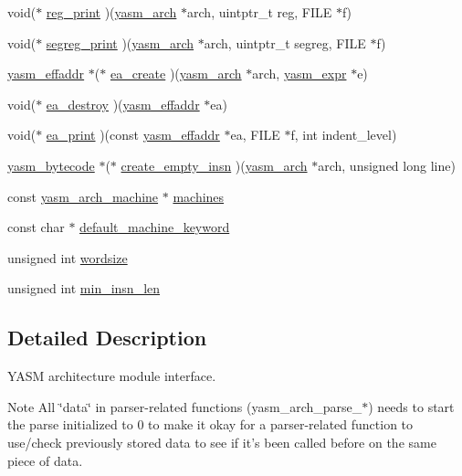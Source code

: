 \begin{DoxyCompactItemize}
\item 
void($\ast$ \hyperlink{structyasm__arch__module_a6dc5cfaa6ddd2c654abf3599ba219ef0}{reg\-\_\-print} )(\hyperlink{coretype_8h_a8e0de61d73c940f0e7b6ef12e0dc1c70}{yasm\-\_\-arch} $\ast$arch, uintptr\-\_\-t reg, F\-I\-L\-E $\ast$f)
\item 
void($\ast$ \hyperlink{structyasm__arch__module_a0cc2000fdd21f86497271c6957f0a833}{segreg\-\_\-print} )(\hyperlink{coretype_8h_a8e0de61d73c940f0e7b6ef12e0dc1c70}{yasm\-\_\-arch} $\ast$arch, uintptr\-\_\-t segreg, F\-I\-L\-E $\ast$f)
\item 
\hyperlink{structyasm__effaddr}{yasm\-\_\-effaddr} $\ast$($\ast$ \hyperlink{structyasm__arch__module_ac41bf595c524eed5dfebb16514eefad3}{ea\-\_\-create} )(\hyperlink{coretype_8h_a8e0de61d73c940f0e7b6ef12e0dc1c70}{yasm\-\_\-arch} $\ast$arch, \hyperlink{structyasm__expr}{yasm\-\_\-expr} $\ast$e)
\item 
void($\ast$ \hyperlink{structyasm__arch__module_acfe30289d9c3300986fe4f73c92ca644}{ea\-\_\-destroy} )(\hyperlink{structyasm__effaddr}{yasm\-\_\-effaddr} $\ast$ea)
\item 
void($\ast$ \hyperlink{structyasm__arch__module_a70b26bcf811aabae77bccd78594ca731}{ea\-\_\-print} )(const \hyperlink{structyasm__effaddr}{yasm\-\_\-effaddr} $\ast$ea, F\-I\-L\-E $\ast$f, int indent\-\_\-level)
\item 
\hyperlink{structyasm__bytecode}{yasm\-\_\-bytecode} $\ast$($\ast$ \hyperlink{structyasm__arch__module_aded6d7577574b5fdb988cff2d062fde4}{create\-\_\-empty\-\_\-insn} )(\hyperlink{coretype_8h_a8e0de61d73c940f0e7b6ef12e0dc1c70}{yasm\-\_\-arch} $\ast$arch, unsigned long line)
\item 
const \hyperlink{structyasm__arch__machine}{yasm\-\_\-arch\-\_\-machine} $\ast$ \hyperlink{structyasm__arch__module_aa9831300bb203ec3cdb35862b6187ebc}{machines}
\item 
const char $\ast$ \hyperlink{structyasm__arch__module_ab935f77e9d4fafaf06c3561219ed7e3c}{default\-\_\-machine\-\_\-keyword}
\item 
unsigned int \hyperlink{structyasm__arch__module_ac83222855b248fc10ccfd393279fe9a4}{wordsize}
\item 
unsigned int \hyperlink{structyasm__arch__module_a0ca18842f63879a3311ac9f6fe35b8df}{min\-\_\-insn\-\_\-len}
\end{DoxyCompactItemize}


\subsection{Detailed Description}
Y\-A\-S\-M architecture module interface. \begin{DoxyNote}{Note}
All \char`\"{}data\char`\"{} in parser-\/related functions (yasm\-\_\-arch\-\_\-parse\-\_\-$\ast$) needs to start the parse initialized to 0 to make it okay for a parser-\/related function to use/check previously stored data to see if it's been called before on the same piece of data. 
\end{DoxyNote}


